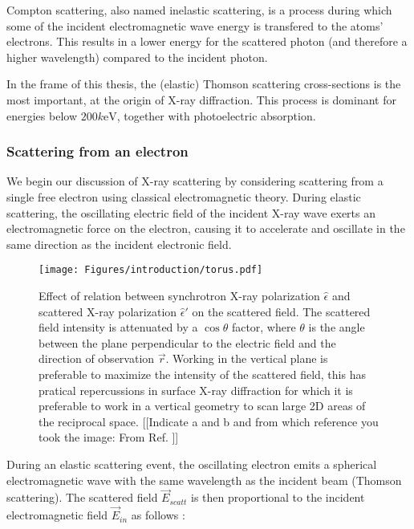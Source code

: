Compton scattering, also named inelastic scattering, is a process during which some of the incident electromagnetic wave energy is transfered to the atoms' electrons.
This results in a lower energy for the scattered photon (and therefore a higher wavelength) compared to the incident photon.

In the frame of this thesis, the (elastic) Thomson scattering cross-sections is the most important, at the origin of X-ray diffraction.
This process is dominant for energies below $200 \si{k\electronvolt}$, together with photoelectric absorption.%

\subsubsection{Scattering from an electron}

We begin our discussion of X-ray scattering by considering scattering from a single free electron using classical electromagnetic theory.
During elastic scattering, the oscillating electric field of the incident X-ray wave exerts an electromagnetic force on the electron, causing it to accelerate and oscillate in the same direction as the incident electronic field.

\begin{figure}[!htb]
    \centering
    \texttt{[image: Figures/introduction/torus.pdf]}
    \caption{
        Effect of relation between synchrotron X-ray polarization $\hat{\epsilon}$ and scattered X-ray polarization $\hat{\epsilon}'$ on the scattered field.
        The scattered field intensity is attenuated by a $\cos{\theta}$ factor, where $\theta$ is the angle between the plane perpendicular to the electric field and the direction of observation $\vec{r}$.
        Working in the vertical plane is preferable to maximize the intensity of the scattered field, this has pratical repercussions in surface X-ray diffraction for which it is preferable to work in a vertical geometry to scan large 2D areas of the reciprocal space. {\color{DarkOrange}[[Indicate a and b and from which reference you took the image: From Ref. ]]}
    }
    \label{fig:polarization_effect}
\end{figure}

During an elastic scattering event, the oscillating electron emits a spherical electromagnetic wave with the same wavelength as the incident beam (Thomson scattering).
The scattered field $\vec{E}_{scatt}$ is then proportional to the incident electromagnetic field $\vec{E}_{in}$ as follows \parencite{NielsenMcMorrow}:

